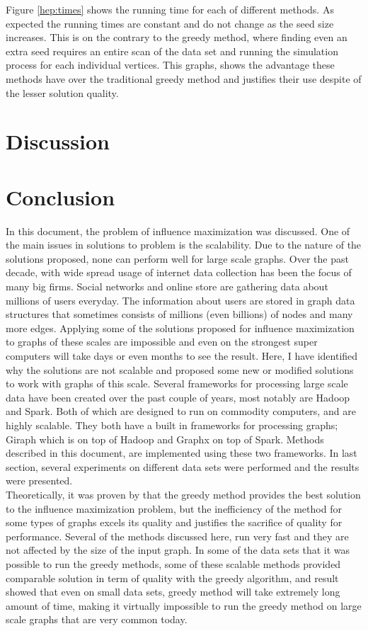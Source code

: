 \documentclass[english]{tktltiki}
\begin{document}
Figure \ref{hep:times} shows the running time for each of different methods. As expected the running times are constant and do not change as the seed size increases. This is on the contrary to the greedy method, where finding even an extra seed requires an entire scan of the data set and running the simulation process for each individual vertices. This graphs, shows the advantage these methods have over the traditional greedy method and justifies their use despite of the lesser solution quality.

\pagebreak

\section{Discussion}

\pagebreak
\section{Conclusion}
In this document, the problem of influence maximization was discussed. One of the main issues in solutions to problem is the scalability. Due to the nature of the solutions proposed, none can perform well for large scale graphs. Over the past decade, with wide spread usage of internet data collection has been the focus of many big firms. Social networks and online store are gathering data about millions of users everyday. The information about users are stored in graph data structures that sometimes consists of millions (even billions) of nodes and  many more edges. Applying some of the solutions proposed for influence maximization to graphs of these scales are impossible and even on the strongest super computers will take days or even months to see the result. Here, I have identified why the solutions are not scalable and proposed some new or modified solutions to work with graphs of this scale. Several frameworks for processing large scale data have been created over the past couple of years, most notably are Hadoop and Spark. Both of which are designed to run on commodity computers, and are highly scalable. They both have a built in frameworks for processing graphs; Giraph which is on top of Hadoop and Graphx on top of Spark. Methods described in this document, are implemented using these two frameworks. In last section, several experiments on different data sets were performed and the results were presented. \\
Theoretically, it was proven by \cite{kempe03} that the greedy method provides the best solution to the influence maximization problem, but the inefficiency of the method for some types of graphs excels its quality and justifies the sacrifice of quality for performance. Several of the methods discussed here, run very fast and they are not affected by the size of the input graph. In some of the data sets that it was possible to run the greedy methods, some of these scalable methods provided comparable solution in term of quality with the greedy algorithm, and result showed that even on small data sets, greedy method will take extremely long amount of time, making it virtually impossible to run the greedy method on large scale graphs that are very common today. \\
\end{document}

